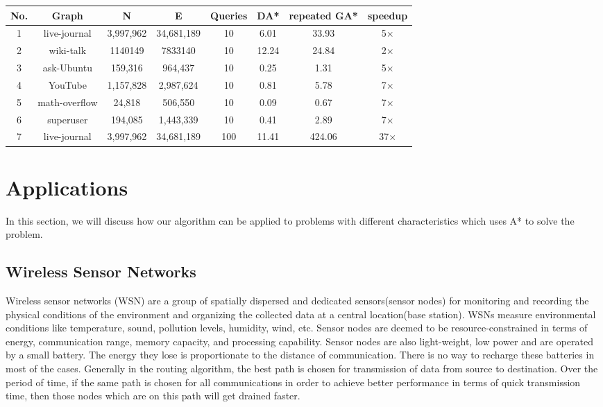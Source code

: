 \documentclass[a4paper]{article}
\begin{document}
 \label{tab:comparison}
\begin{tabular}{ |c|c|c|c|c|c|c|c| } 
 \hline
 No. & Graph & N & E & Queries & DA* & repeated GA* & speedup \\ 
 \hline
 1 & live-journal & 3,997,962 &    34,681,189 & 10    & 6.01 & 33.93 & 5$\times$\\
 2 & wiki-talk & 1140149 & 7833140 & 10 & 12.24 & 24.84 & 2$\times$\\
 3 & ask-Ubuntu & 159,316 &    964,437 & 10 & 0.25     & 1.31 & 5$\times$\\
 4 & YouTube & 1,157,828 & 2,987,624 & 10 & 0.81 &    5.78 & 7$\times$\\
 5 & math-overflow &    24,818    & 506,550    & 10 & 0.09 & 0.67 & 7$\times$\\
 6 & superuser & 194,085 & 1,443,339 & 10 &    0.41 & 2.89 & 7$\times$\\
 \hline
 7 & live-journal &    3,997,962 & 34,681,189    & 100 &    11.41 &    424.06  & 37$\times$\\
 \hline
\end{tabular}

\section{Applications}\label{sec:applications}
In this section, we will discuss how our algorithm can be applied to problems with different characteristics which uses A* to solve the problem.
\subsection{Wireless Sensor Networks}\label{subsec:WSN}
Wireless sensor networks (WSN) are a group of spatially dispersed and dedicated sensors(sensor nodes) for monitoring and recording the physical conditions of the environment and organizing the collected data at a central location(base station). WSNs measure environmental conditions like temperature, sound, pollution levels, humidity, wind, etc. Sensor nodes are deemed to be resource-constrained in terms of energy, communication range, memory capacity, and processing capability. Sensor nodes are also light-weight, low power and are operated by a small battery. The energy they lose is proportionate to the distance of communication. There is no way to recharge these batteries in most of the cases. Generally in the routing algorithm, the best path is chosen for transmission of data from source to destination. Over the period of time, if the same path is chosen for all communications in order to achieve better performance in terms of quick transmission time, then those nodes which are on this path will get drained faster.
\end{document}

